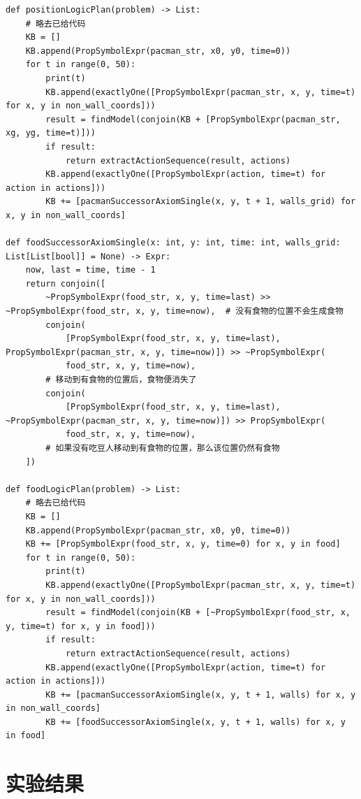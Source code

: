 \begin{lstlisting}
def positionLogicPlan(problem) -> List:
    # 略去已给代码
    KB = []
    KB.append(PropSymbolExpr(pacman_str, x0, y0, time=0))
    for t in range(0, 50):
        print(t)
        KB.append(exactlyOne([PropSymbolExpr(pacman_str, x, y, time=t) for x, y in non_wall_coords]))
        result = findModel(conjoin(KB + [PropSymbolExpr(pacman_str, xg, yg, time=t)]))
        if result:
            return extractActionSequence(result, actions)
        KB.append(exactlyOne([PropSymbolExpr(action, time=t) for action in actions]))
        KB += [pacmanSuccessorAxiomSingle(x, y, t + 1, walls_grid) for x, y in non_wall_coords]

def foodSuccessorAxiomSingle(x: int, y: int, time: int, walls_grid: List[List[bool]] = None) -> Expr:
    now, last = time, time - 1
    return conjoin([
        ~PropSymbolExpr(food_str, x, y, time=last) >> ~PropSymbolExpr(food_str, x, y, time=now),  # 没有食物的位置不会生成食物
        conjoin(
            [PropSymbolExpr(food_str, x, y, time=last), PropSymbolExpr(pacman_str, x, y, time=now)]) >> ~PropSymbolExpr(
            food_str, x, y, time=now),
        # 移动到有食物的位置后，食物便消失了
        conjoin(
            [PropSymbolExpr(food_str, x, y, time=last), ~PropSymbolExpr(pacman_str, x, y, time=now)]) >> PropSymbolExpr(
            food_str, x, y, time=now),
        # 如果没有吃豆人移动到有食物的位置，那么该位置仍然有食物
    ])

def foodLogicPlan(problem) -> List:
    # 略去已给代码
    KB = []
    KB.append(PropSymbolExpr(pacman_str, x0, y0, time=0))
    KB += [PropSymbolExpr(food_str, x, y, time=0) for x, y in food]
    for t in range(0, 50):
        print(t)
        KB.append(exactlyOne([PropSymbolExpr(pacman_str, x, y, time=t) for x, y in non_wall_coords]))
        result = findModel(conjoin(KB + [~PropSymbolExpr(food_str, x, y, time=t) for x, y in food]))
        if result:
            return extractActionSequence(result, actions)
        KB.append(exactlyOne([PropSymbolExpr(action, time=t) for action in actions]))
        KB += [pacmanSuccessorAxiomSingle(x, y, t + 1, walls) for x, y in non_wall_coords]
        KB += [foodSuccessorAxiomSingle(x, y, t + 1, walls) for x, y in food]
\end{lstlisting}
\section{实验结果}

